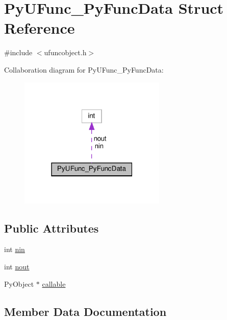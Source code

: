 \hypertarget{structPyUFunc__PyFuncData}{}\section{Py\+U\+Func\+\_\+\+Py\+Func\+Data Struct Reference}
\label{structPyUFunc__PyFuncData}


{\ttfamily \#include $<$ufuncobject.\+h$>$}



Collaboration diagram for Py\+U\+Func\+\_\+\+Py\+Func\+Data\+:
\nopagebreak
\begin{figure}[H]
\begin{center}
\leavevmode
\includegraphics[width=198pt]{structPyUFunc__PyFuncData__coll__graph}
\end{center}
\end{figure}
\subsection*{Public Attributes}
\begin{DoxyCompactItemize}
\item 
int \hyperlink{structPyUFunc__PyFuncData_a0cd94ed840dcbbcffe4c2de373f5602b}{nin}
\item 
int \hyperlink{structPyUFunc__PyFuncData_abfd42839e23c29c59747c0a6fb9a0b0b}{nout}
\item 
Py\+Object $\ast$ \hyperlink{structPyUFunc__PyFuncData_ad969513d73c5da8ea5015629f226d82b}{callable}
\end{DoxyCompactItemize}


\subsection{Member Data Documentation}
\mbox{\label{structPyUFunc__PyFuncData_ad969513d73c5da8ea5015629f226d82b}} 
